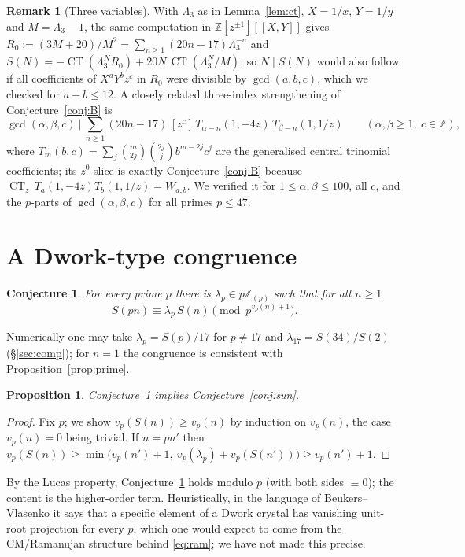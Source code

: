 \documentclass[11pt]{amsart}
\newtheorem{proposition}[theorem]{Proposition}
\newtheorem{conjecture}[theorem]{Conjecture}
\theoremstyle{definition}
\newtheorem{remark}[theorem]{Remark}
\newcommand{\Z}{\mathbb{Z}}
\newcommand{\CT}{\operatorname{CT}}
\begin{document}
\begin{remark}[Three variables]\label{rem:three}
With $\Lambda_3$ as in Lemma~\ref{lem:ct}, $X=1/x$, $Y=1/y$ and $M=\Lambda_3-1$, the same
computation in $\Z[z^{\pm1}][[X,Y]]$ gives $R_0:=(3M+20)/M^2=\sum_{n\ge1}(20n-17)\Lambda_3^{-n}$ and
$S(N)=-\CT(\Lambda_3^NR_0)+20N\,\CT(\Lambda_3^N/M)$; so $N\mid S(N)$ would also follow if all
coefficients of $X^aY^bz^c$ in $R_0$ were divisible by $\gcd(a,b,c)$, which we checked for $a+b\le12$.
A closely related three-index strengthening of Conjecture~\ref{conj:B} is
\[
\gcd(\alpha,\beta,c)\ \Big|\ \sum_{n\ge1}(20n-17)\,[z^c]\,T_{\alpha-n}(1,-4z)\,T_{\beta-n}(1,1/z)
\qquad(\alpha,\beta\ge1,\ c\in\Z),
\]
where $T_m(b,c)=\sum_j\binom m{2j}\binom{2j}jb^{m-2j}c^j$ are the generalised central trinomial
coefficients; its $z^0$-slice is exactly Conjecture~\ref{conj:B} because
$\CT_z\,T_a(1,-4z)T_b(1,1/z)=W_{a,b}$. We verified it for $1\le\alpha,\beta\le100$, all $c$, and the
$p$-parts of $\gcd(\alpha,\beta,c)$ for all primes $p\le47$.
\end{remark}

\section{A Dwork-type congruence}\label{sec:dwork}

\begin{conjecture}\label{conj:D}
For every prime $p$ there is $\lambda_p\in p\Z_{(p)}$ such that for all $n\ge1$
\[
S(pn)\equiv\lambda_p\,S(n)\pmod{p^{v_p(n)+1}}.
\]
\end{conjecture}

Numerically one may take $\lambda_p=S(p)/17$ for $p\ne17$ and $\lambda_{17}=S(34)/S(2)$
(\S\ref{sec:comp}); for $n=1$ the congruence is consistent with Proposition~\ref{prop:prime}.

\begin{proposition}\label{prop:D}
Conjecture~\ref{conj:D} implies Conjecture~\ref{conj:sun}.
\end{proposition}

\begin{proof}
Fix $p$; we show $v_p(S(n))\ge v_p(n)$ by induction on $v_p(n)$, the case $v_p(n)=0$ being trivial.
If $n=pn'$ then $v_p(S(n))\ge\min\big(v_p(n')+1,\ v_p(\lambda_p)+v_p(S(n'))\big)\ge v_p(n')+1$.
\end{proof}

By the Lucas property, Conjecture~\ref{conj:D} holds modulo $p$ (with both sides $\equiv0$); the
content is the higher-order term. Heuristically, in the language of Beukers--Vlasenko \cite{BV1,BV3} it says that a specific
element of a Dwork crystal has vanishing unit-root projection for every $p$, which one would expect
to come from the CM/Ramanujan structure behind \eqref{eq:ram}; we have not made this precise.
\end{document}
